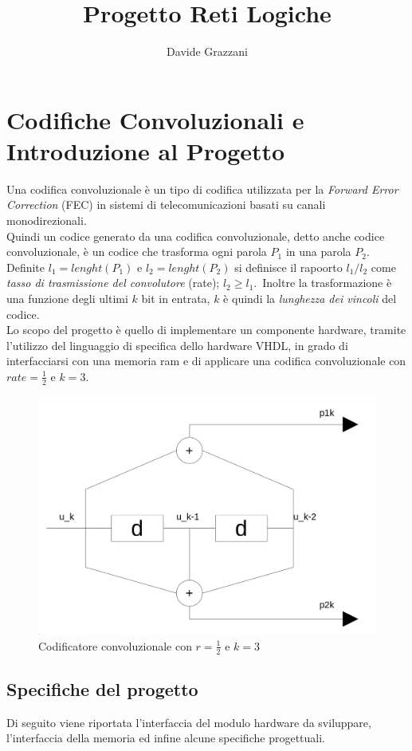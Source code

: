 \documentclass[11pt,a4paper]{article}
\author{\Large Davide Grazzani}
\title{\Huge \Huge Progetto Reti Logiche}
\date{}
\begin{document}
    \maketitle
    \newpage

    \tableofcontents
    \newpage

    \section{Codifiche Convoluzionali e Introduzione al Progetto}
    Una codifica convoluzionale è un tipo di codifica utilizzata per la \textit{Forward Error Correction} (FEC) in sistemi di telecomunicazioni basati su canali monodirezionali. \\
    Quindi un codice generato da una codifica convoluzionale, detto anche codice convoluzionale, è un codice che trasforma ogni parola $P_1$ in una parola $P_2$. Definite $l_1 = lenght(P_1)$ e $l_2 = lenght(P_2)$ si definisce il rapoorto $l_1/l_2$ come \textit{tasso di trasmissione del convolutore} (rate); $l_2 \geq l_1$.\
    Inoltre la trasformazione è una funzione degli ultimi $k$ bit in entrata, $k$ è quindi la \textit{lunghezza dei vincoli} del codice.\\
    Lo scopo del progetto è quello di implementare un componente hardware, tramite l'utilizzo del linguaggio di specifica dello hardware VHDL, in grado di interfacciarsi con una memoria ram e di applicare una codifica convoluzionale con $rate = \frac{1}{2}$ e $k = 3$.
    \begin{figure}[h]
        \centering
        \includegraphics[width = 0.5\linewidth]{convolutore_image.png}
        \caption{Codificatore convoluzionale con $r = \frac{1}{2}$ e $k = 3$}
        \label{codificatore_convoluzionale_image}
    \end{figure}
    \subsection{Specifiche del progetto}
        Di seguito viene riportata l'interfaccia del modulo hardware da sviluppare, l'interfaccia della memoria ed infine alcune specifiche progettuali.
\end{document}
